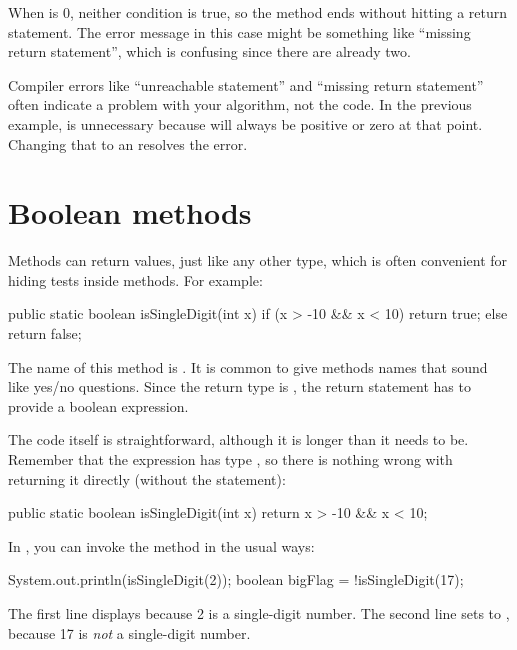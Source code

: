 When  is 0, neither condition is true, so the method ends without hitting a return statement.
The error message in this case might be something like ``missing return statement'', which is confusing since there are already two.

Compiler errors like ``unreachable statement'' and ``missing return statement'' often indicate a problem with your algorithm, not the code.
In the previous example,  is unnecessary because  will always be positive or zero at that point.
Changing that  to an  resolves the error.


\section{Boolean methods}
\label{boolean}


Methods can return  values, just like any other type, which is often convenient for hiding tests inside methods.
For example:

\begin{code}
public static boolean isSingleDigit(int x) {
    if (x > -10 && x < 10) {
        return true;
    } else {
        return false;
    }
}
\end{code}

The name of this method is .
It is common to give  methods names that sound like yes/no questions.
Since the return type is , the return statement has to provide a boolean expression.

The code itself is straightforward, although it is longer than it needs to be.
Remember that the expression  has type , so there is nothing wrong with returning it directly (without the  statement):

\begin{code}
public static boolean isSingleDigit(int x) {
    return x > -10 && x < 10;
}
\end{code}

In , you can invoke the method in the usual ways:

\begin{code}
System.out.println(isSingleDigit(2));
boolean bigFlag = !isSingleDigit(17);
\end{code}

The first line displays  because 2 is a single-digit number.
The second line sets  to , because 17 is {\em not} a single-digit number.

